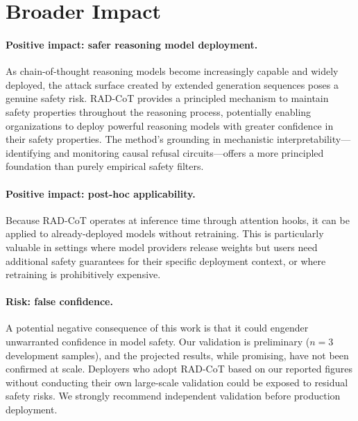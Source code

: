 \documentclass[11pt]{article}
\begin{document}

\section{Broader Impact}
\label{sec:broader_impact}

\paragraph{Positive impact: safer reasoning model deployment.}
As chain-of-thought reasoning models become increasingly capable and widely deployed, the attack surface created by extended generation sequences poses a genuine safety risk. RAD-CoT provides a principled mechanism to maintain safety properties throughout the reasoning process, potentially enabling organizations to deploy powerful reasoning models with greater confidence in their safety properties. The method's grounding in mechanistic interpretability---identifying and monitoring causal refusal circuits---offers a more principled foundation than purely empirical safety filters.

\paragraph{Positive impact: post-hoc applicability.}
Because RAD-CoT operates at inference time through attention hooks, it can be applied to already-deployed models without retraining. This is particularly valuable in settings where model providers release weights but users need additional safety guarantees for their specific deployment context, or where retraining is prohibitively expensive.

\paragraph{Risk: false confidence.}
A potential negative consequence of this work is that it could engender unwarranted confidence in model safety. Our validation is preliminary ($n=3$ development samples), and the projected results, while promising, have not been confirmed at scale. Deployers who adopt RAD-CoT based on our reported figures without conducting their own large-scale validation could be exposed to residual safety risks. We strongly recommend independent validation before production deployment.
\end{document}
